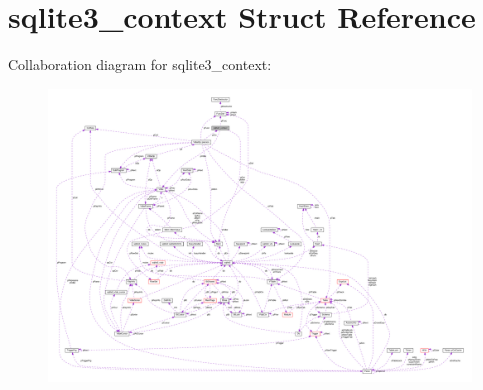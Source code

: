 \hypertarget{structsqlite3__context}{}\section{sqlite3\+\_\+context Struct Reference}
\label{structsqlite3__context}


Collaboration diagram for sqlite3\+\_\+context\+:\nopagebreak
\begin{figure}[H]
\begin{center}
\leavevmode
\includegraphics[width=350pt]{structsqlite3__context__coll__graph}
\end{center}
\end{figure}
